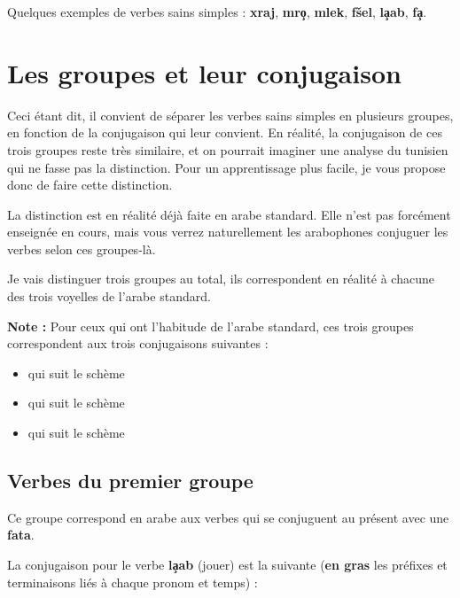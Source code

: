 Quelques exemples de verbes sains simples : \textbf{xraj}, \textbf{mro\c{\dh}}, \textbf{mlek}, \textbf{f\v{s}el}, \textbf{l\c{a}ab}, \textbf{\textcrh fa\c{\dh}}.


\section{Les groupes et leur conjugaison}
Ceci étant dit, il convient de séparer les verbes sains simples en plusieurs groupes, en fonction de la conjugaison qui leur convient. En réalité, la conjugaison de ces trois groupes reste très similaire, et on pourrait imaginer une analyse du tunisien qui ne fasse pas la distinction. Pour un apprentissage plus facile, je vous propose donc de faire cette distinction.

La distinction est en réalité déjà faite en arabe standard. Elle n'est pas forcément enseignée en cours, mais vous verrez naturellement les arabophones conjuguer les verbes selon ces groupes-là.

Je vais distinguer trois groupes au total, ils correspondent en réalité à chacune des trois voyelles de l'arabe standard. 

\textbf{Note :} Pour ceux qui ont l'habitude de l'arabe standard, ces trois groupes correspondent aux trois conjugaisons suivantes : 
\begin{itemize}
    \item {} qui suit le schème 
    \item {} qui suit le schème 
    \item {} qui suit le schème 
\end{itemize}

\subsection{Verbes du premier groupe}
Ce groupe correspond en arabe aux verbes qui se conjuguent au présent avec une \textbf{fat\textcrh a}.

La conjugaison pour le verbe \textbf{l\c{a}ab} (jouer) est la suivante (\textbf{en gras} les préfixes et terminaisons liés à chaque pronom et temps) :

